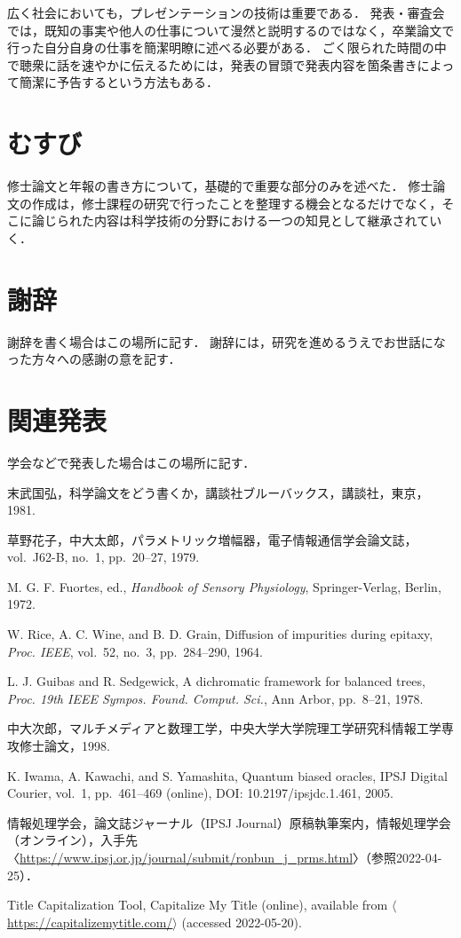 \documentclass[10pt,a4paper,notitlepage,oneside,twocolumn]{abst_ltjsarticle}
\begin{document}
広く社会においても，プレゼンテーションの技術は重要である．
発表・審査会では，既知の事実や他人の仕事について漫然と説明するのではなく，卒業論文で行った自分自身の仕事を簡潔明瞭に述べる必要がある．
ごく限られた時間の中で聴衆に話を速やかに伝えるためには，発表の冒頭で発表内容を箇条書きによって簡潔に予告するという方法もある．


\section{むすび}
修士論文と年報の書き方について，基礎的で重要な部分のみを述べた．
修士論文の作成は，修士課程の研究で行ったことを整理する機会となるだけでなく，そこに論じられた内容は科学技術の分野における一つの知見として継承されていく．



\section*{謝辞}

謝辞を書く場合はこの場所に記す．
謝辞には，研究を進めるうえでお世話になった方々への感謝の意を記す．


\section*{関連発表}

学会などで発表した場合はこの場所に記す．


\begin{thebibliography}{99}

末武国弘，科学論文をどう書くか，講談社ブルーバックス，講談社，東京，1981. 

草野花子，中大太郎，パラメトリック増幅器，電子情報通信学会論文誌，vol.~J62-B, no.~1, pp.~20--27, 1979. 

M. G. F. Fuortes, ed., \textit{Handbook of Sensory Physiology}, Springer-Verlag, Berlin, 1972.

W. Rice, A. C. Wine, and B. D. Grain, Diffusion of impurities during epitaxy, \textit{Proc. IEEE}, vol.~52, no.~3, pp.~284--290, 1964.

L. J. Guibas and R. Sedgewick, A dichromatic framework for balanced trees, 
\textit{Proc. 19th IEEE Sympos. Found. Comput. Sci.}, Ann Arbor, pp.~8--21, 1978.

中大次郎，マルチメディアと数理工学，中央大学大学院理工学研究科情報工学専攻修士論文，1998.

K. Iwama, A. Kawachi, and S. Yamashita, Quantum biased oracles, IPSJ Digital Courier, vol.~1, pp.~461--469 (online), DOI: 10.2197/ipsjdc.1.461, 2005.

情報処理学会，論文誌ジャーナル（IPSJ Journal）原稿執筆案内，情報処理学会（オンライン），入手先〈\url{https://www.ipsj.or.jp/journal/submit/ronbun_j_prms.html}〉（参照2022-04-25）．

Title Capitalization Tool, Capitalize My Title (online), available from $\langle$\url{https://capitalizemytitle.com/}$\rangle$ (accessed 2022-05-20). 


\end{thebibliography}
\end{document}
